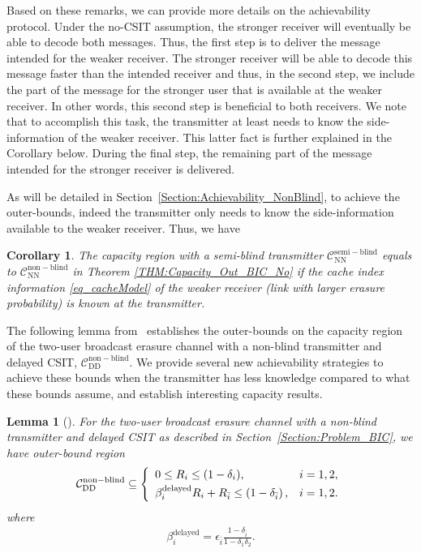 \documentclass[journal,12pt,draftcls,onecolumn]{IEEEtran}
\newtheorem{corollary}{Corollary}
\newtheorem{lemma}{Lemma}
\begin{document}
Based on these remarks, we can provide more details on the achievability protocol. Under the no-CSIT assumption, the stronger receiver will eventually be able to decode both messages. Thus, the first step is to deliver the message intended for the weaker receiver. The stronger receiver will be able to decode this message faster than the intended receiver and thus, in the second step, we include the part of the message for the stronger user that is available at the weaker receiver. In other words, this second step is beneficial to both receivers. We note that to accomplish this task, the transmitter at least needs to know the side-information of the weaker receiver. This latter fact is further explained in the Corollary below. During the final step, the remaining part of the message intended for the stronger receiver is delivered.


As will be detailed in Section~\ref{Section:Achievability_NonBlind}, to achieve the outer-bounds, indeed the transmitter only needs to know the side-information available to the weaker receiver. Thus, we have

\begin{corollary} \label{remark:semiblind}
The capacity region with a semi-blind transmitter $\mathcal{C}^{\mathrm{semi-blind}}_{\mathrm{NN}}$ equals to $\mathcal{C}^{\mathrm{non-blind}}_{\mathrm{NN}}$ in Theorem \ref{THM:Capacity_Out_BIC_No} if the cache index information \eqref{eq_cacheModel} of the weaker receiver (link with larger erasure probability) is known at the transmitter.
\end{corollary}

The following lemma from~\cite{ghorbel2016content} establishes the outer-bounds on the capacity region of the two-user broadcast erasure channel with a non-blind transmitter and delayed CSIT, $\mathcal{C}^{\mathrm{non-blind}}_{\mathrm{DD}}$. We provide several new achievability strategies to achieve these bounds when the transmitter has less knowledge compared to what these bounds assume, and establish interesting capacity results.

\begin{lemma}[\cite{ghorbel2016content}]
\label{LEM:Capacity_Out_BIC_Delayed}
For the two-user broadcast erasure channel with a non-blind transmitter and delayed CSIT as described in Section~\ref{Section:Problem_BIC}, we have outer-bound region
\begin{equation}
\label{Eq:Capacity_Out_BIC_Delayed}
\mathcal{C}^{\mathrm{non-blind}}_{\mathrm{DD}} \subseteq
\left\{ \begin{array}{ll}
\vspace{1mm} 0 \leq R_i \leq (1-\delta_i), &  i = 1,2, \\
\beta^{\mathrm{delayed}}_i R_i + R_{\bar{i}} \leq \left( 1 - \delta_{\bar{i}} \right), & i = 1,2.
\end{array} \right.
\end{equation}
where
\begin{align}
\label{Eq:Beta_Delayed}
\beta^{\mathrm{delayed}}_i = \epsilon_{\bar{i}}\frac{1-\delta_{\bar{i}}}{1-\delta_{1}\delta_{2}}.
\end{align}
\end{lemma}
\end{document}
